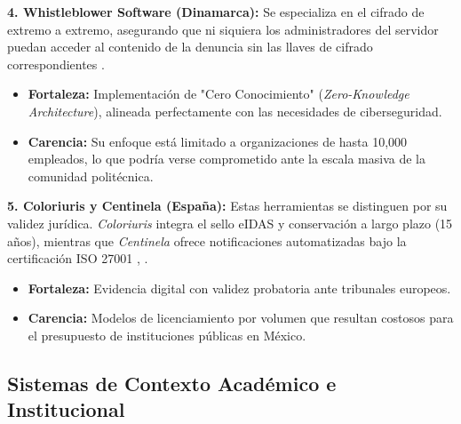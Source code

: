 \begin{flushleft}
\textbf{4. Whistleblower Software (Dinamarca):}
Se especializa en el cifrado de extremo a extremo, asegurando que ni siquiera los administradores del servidor puedan acceder al contenido de la denuncia sin las llaves de cifrado correspondientes \cite{18}.
\begin{itemize}
    \item \textbf{Fortaleza:} Implementación de "Cero Conocimiento" (\textit{Zero-Knowledge Architecture}), alineada perfectamente con las necesidades de ciberseguridad.
    \item \textbf{Carencia:} Su enfoque está limitado a organizaciones de hasta 10,000 empleados, lo que podría verse comprometido ante la escala masiva de la comunidad politécnica.
\end{itemize}

\textbf{5. Coloriuris y Centinela (España):}
Estas herramientas se distinguen por su validez jurídica. \textit{Coloriuris} integra el sello eIDAS y conservación a largo plazo (15 años), mientras que \textit{Centinela} ofrece notificaciones automatizadas bajo la certificación ISO 27001 \cite{19}, \cite{20}.
\begin{itemize}
    \item \textbf{Fortaleza:} Evidencia digital con validez probatoria ante tribunales europeos.
    \item \textbf{Carencia:} Modelos de licenciamiento por volumen que resultan costosos para el presupuesto de instituciones públicas en México.
\end{itemize}
\end{flushleft}

\subsection{Sistemas de Contexto Académico e Institucional}

